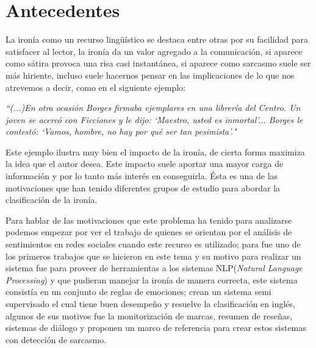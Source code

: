 \chapter{Antecedentes}\label{cap.antecedentes}

\par La ironía como un recurso lingüístico se destaca entre otras por su facilidad para satisfacer al lector, la ironía da un valor agregado a la comunicación, si aparece como sátira provoca una risa casi instantánea, si aparece como sarcasmo suele ser más hiriente, incluso suele hacernos pensar en las implicaciones de lo que nos atrevemos a decir, como en el siguiente ejemplo:

\begin{center}
	\textit{``(...)En otra ocasión Borges firmaba ejemplares en una librería del Centro. Un joven se acercó con Ficciones y le dijo: `Maestro, usted es inmortal'... Borges le contestó: `Vamos, hombre, no hay por qué ser tan pesimista'."} \cite{Sergio2012}
	\vspace{5pt}
\end{center}
\vspace{5pt}

\par Este ejemplo ilustra muy bien el impacto de la ironía, de cierta forma maximiza la idea que el autor desea. Este impacto suele aportar una mayor carga de información y por lo tanto más interés en conseguirla. Ésta es una de las motivaciones que han tenido diferentes grupos de estudio para abordar la clasificación de la ironía.

\par Para hablar de las motivaciones que este problema ha tenido para analizarse podemos empezar por ver el trabajo de \cite{maynard2014cares} quienes se orientan por el análisis de sentimientos en redes sociales cuando este recurso es utilizado; para \cite{utsumi1995interpret} fue uno de los primeros trabajos que se hicieron en este tema y su motivo para realizar un sistema fue para proveer de herramientas a los sistemas NLP(\textit{Natural Language Processing}) y que pudieran manejar la ironía de manera correcta, este sistema consistía en un conjunto de reglas de emociones; \cite{davidov2010semi} crean un sistema semi supervisado el cual tiene buen desempeño y resuelve la clasificación en inglés, algunos de sus motivos fue la monitorización de marcas, resumen de reseñas, sistemas de diálogo y proponen un marco de referencia para crear estos sistemas con detección de sarcasmo.
